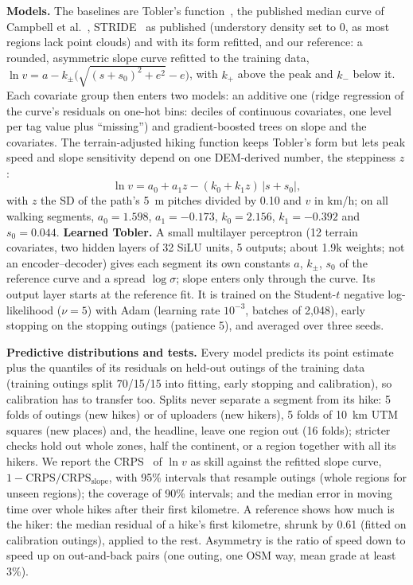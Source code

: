 \textbf{Models.} The baselines are Tobler's function~\cite{tobler1993},
the published median curve of Campbell et al.~\cite{campbell2022variability},
STRIDE~\cite{campbell2024stride} as published (understory density set to
0, as most regions lack point clouds) and with its form refitted,
and our reference: a rounded, asymmetric slope curve refitted to the
training data, $\ln v = a - k_\pm\big(\sqrt{(s+s_0)^2+e^2}-e\big)$, with
$k_+$ above the peak and $k_-$ below it. Each covariate group then enters
two models: an additive one (ridge regression of the curve's residuals on
one-hot bins: deciles of continuous covariates, one level per tag value plus
``missing'') and gradient-boosted trees on slope and the covariates. The
terrain-adjusted hiking function keeps Tobler's form but lets peak speed
and slope sensitivity depend on one DEM-derived number, the steppiness
$z$:
\begin{equation}
\ln v = a_0 + a_1 z - (k_0 + k_1 z)\,|s + s_0|,
\label{eq:terrain}
\end{equation}
with $z$ the SD of the path's 5~m pitches divided by 0.10 and $v$ in km/h;
on all walking segments, $a_0 = 1.598$, $a_1 = -0.173$, $k_0 = 2.156$,
$k_1 = -0.392$ and $s_0 = 0.044$.
\textbf{Learned Tobler.} A small multilayer perceptron (12 terrain
covariates, two hidden layers of 32 SiLU units, 5 outputs; about 1.9k
weights; not an encoder--decoder) gives each segment its own constants
$a$, $k_\pm$, $s_0$ of the reference curve and a spread $\log\sigma$;
slope enters only through the curve. Its output layer starts at the
reference fit. It is trained on the Student-$t$ negative log-likelihood
($\nu=5$) with Adam (learning rate $10^{-3}$, batches of 2,048), early
stopping on the stopping outings (patience 5), and averaged over three
seeds.

\textbf{Predictive distributions and tests.} Every model predicts its
point estimate plus the quantiles of its residuals on held-out outings of
the training data (training outings split 70/15/15 into fitting, early
stopping and calibration), so calibration has to transfer too. Splits never
separate a segment from its hike: 5 folds of outings (new hikes) or of
uploaders (new hikers), 5 folds of 10~km UTM squares (new places) and, the
headline, leave one region out (16 folds); stricter checks hold out whole
zones, half the continent, or a region together with all its hikers. We
report the CRPS~\cite{gneiting2007strictly} of $\ln v$ as skill against the refitted
slope curve, $1-\mathrm{CRPS}/\mathrm{CRPS}_{\mathrm{slope}}$, with 95\%
intervals that resample outings (whole regions for unseen regions); the
coverage of 90\% intervals; and the median error in moving time over whole
hikes after their first kilometre. A reference shows how much is the hiker:
the median residual of a hike's first kilometre, shrunk by 0.61 (fitted on
calibration outings), applied to the rest. Asymmetry is the ratio of speed
down to speed up on out-and-back pairs (one outing, one OSM way, mean grade
at least 3\%).

